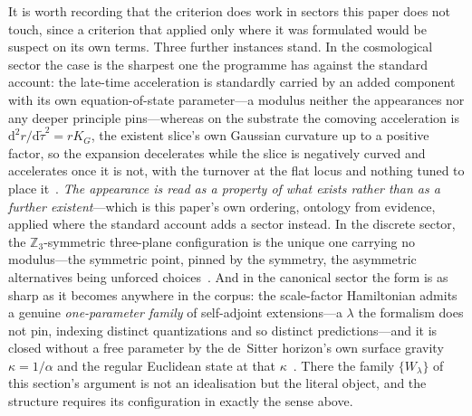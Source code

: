 \documentclass[11pt,a4paper]{article}
\begin{document}
It is worth recording that the criterion does work in sectors this paper does not touch, since a criterion that applied only where it was formulated would be suspect on its own terms. Three further instances stand. In the cosmological sector the case is the sharpest one the programme has against the standard account: the late-time acceleration is standardly carried by an added component with its own equation-of-state parameter---a modulus neither the appearances nor any deeper principle pins---whereas on the substrate the comoving acceleration is $\mathrm{d}^{2}r/\mathrm{d}\tilde\tau^{2}=rK_{G}$, the existent slice's own Gaussian curvature up to a positive factor, so the expansion decelerates while the slice is negatively curved and accelerates once it is not, with the turnover at the flat locus and nothing tuned to place it~\cite{JanzenSlicing,JanzenCRcosmology}. \emph{The appearance is read as a property of what exists rather than as a further existent}---which is this paper's own ordering, ontology from evidence, applied where the standard account adds a sector instead. In the discrete sector, the $\mathbb{Z}_3$-symmetric three-plane configuration is the unique one carrying no modulus---the symmetric point, pinned by the symmetry, the asymmetric alternatives being unforced choices~\cite{JanzenMatter}. And in the canonical sector the form is as sharp as it becomes anywhere in the corpus: the scale-factor Hamiltonian admits a genuine \emph{one-parameter family} of self-adjoint extensions---a $\lambda$ the formalism does not pin, indexing distinct quantizations and so distinct predictions---and it is closed without a free parameter by the de~Sitter horizon's own surface gravity $\kappa=1/\alpha$ and the regular Euclidean state at that $\kappa$~\cite{JanzenCanonicalTime}. There the family $\{W_\lambda\}$ of this section's argument is not an idealisation but the literal object, and the structure requires its configuration in exactly the sense above.
\end{document}

